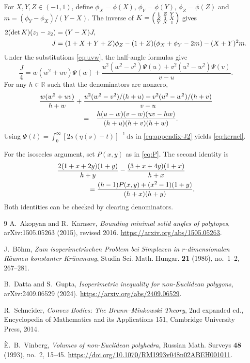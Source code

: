 \documentclass[11pt,reqno]{amsart}
\theoremstyle{remark}
\newcommand{\R}{\mathbb R}
\newcommand{\dd}{\,\mathrm d}
\begin{document}
For $X,Y,Z\in(-1,1)$, define $\phi_X=\phi(X)$, $\phi_Y=\phi(Y)$, $\phi_Z=\phi(Z)$ and $m=(\phi_Y-\phi_X)/(Y-X)$. The inverse of
$K=\begin{psmallmatrix}1&Z&Y\\Z&1&X\\Y&X&1\end{psmallmatrix}$
gives
\begin{align}\label{eq:appendix-J}
 2(\det K)(z_1-z_2)&=(Y-X)J,\\
 J&=(1+X+Y+Z)\phi_Z
 -(1+Z)(\phi_X+\phi_Y-2m)-(X+Y)^2m.\notag
\end{align}
Under the substitutions \eqref{eq:uvw}, the half-angle formulas give
\begin{equation}\label{eq:appendix-J2}
 \frac J4=w(w^2+uv)\Psi(w)
 +\frac{u^2(w^2-v^2)\Psi(u)+v^2(u^2-w^2)\Psi(v)}{v-u}.
\end{equation}
For any $h\in\R$ such that the denominators are nonzero,
\begin{align*}
 &\frac{w(w^2+uv)}{h+w}
 +\frac{u^2(w^2-v^2)/(h+u)+v^2(u^2-w^2)/(h+v)}{v-u}\\
 &\hspace{22mm}=-\frac{h(u-w)(v-w)(uv-hw)}{(h+u)(h+v)(h+w)}.
\end{align*}
Using $\Psi(t)=\int_0^\infty[2s(\eta(s)+t)]^{-1}\dd s$ in \eqref{eq:appendix-J2} yields \eqref{eq:kernel}.

For the isosceles argument, set $P(x,y)$ as in \eqref{eq:P}. The second identity is
\begin{align*}
 &\frac{2(1+x+2y)(1+y)}{h+y}
 -\frac{(3+x+4y)(1+x)}{h+x}\\
 &\hspace{16mm}
 =\frac{(h-1)P(x,y)+(x^2-1)(1+y)}{(h+x)(h+y)}.
\end{align*}
Both identities can be checked by clearing denominators.

\begin{thebibliography}{9}
A.~Akopyan and R.~Karasev,
\emph{Bounding minimal solid angles of polytopes},
arXiv:1505.05263 (2015), revised 2016.
\url{https://arxiv.org/abs/1505.05263}.

J.~B\"ohm,
\emph{Zum isoperimetrischen Problem bei Simplexen in $r$-dimensionalen R\"aumen konstanter Kr\"ummung},
Studia Sci. Math. Hungar. \textbf{21} (1986), no.~1--2, 267--281.

B.~Datta and S.~Gupta,
\emph{Isoperimetric inequality for non-Euclidean polygons},
arXiv:2409.06529 (2024).
\url{https://arxiv.org/abs/2409.06529}.

R.~Schneider,
\emph{Convex Bodies: The Brunn--Minkowski Theory},
2nd expanded ed., Encyclopedia of Mathematics and its Applications 151,
Cambridge University Press, 2014.

\`E.~B.~Vinberg,
\emph{Volumes of non-Euclidean polyhedra},
Russian Math. Surveys \textbf{48} (1993), no.~2, 15--45.
\url{https://doi.org/10.1070/RM1993v048n02ABEH001011}.
\end{thebibliography}
\end{document}
